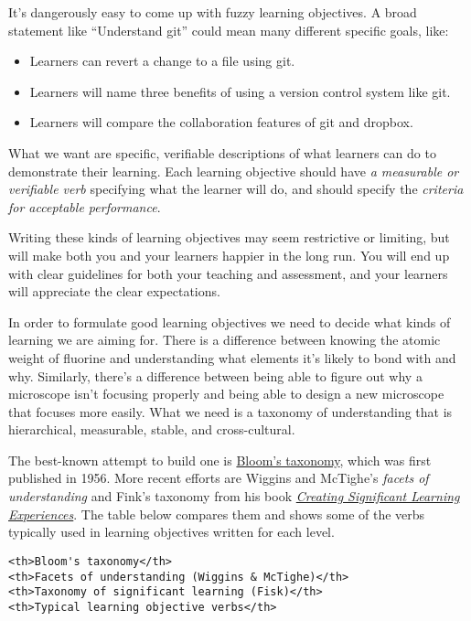 It's dangerously easy to come up with fuzzy learning objectives. A broad
statement like ``Understand git'' could mean many different specific
goals, like:

\begin{itemize}
\itemsep1pt\parskip0pt
\item
  Learners can revert a change to a file using git.
\item
  Learners will name three benefits of using a version control system
  like git.
\item
  Learners will compare the collaboration features of git and dropbox.
\end{itemize}

What we want are specific, verifiable descriptions of what learners can
do to demonstrate their learning. Each learning objective should have
\emph{a measurable or verifiable verb} specifying what the learner will
do, and should specify the \emph{criteria for acceptable performance}.

Writing these kinds of learning objectives may seem restrictive or
limiting, but will make both you and your learners happier in the long
run. You will end up with clear guidelines for both your teaching and
assessment, and your learners will appreciate the clear expectations.

In order to formulate good learning objectives we need to decide what
kinds of learning we are aiming for. There is a difference between
knowing the atomic weight of fluorine and understanding what elements
it's likely to bond with and why. Similarly, there's a difference
between being able to figure out why a microscope isn't focusing
properly and being able to design a new microscope that focuses more
easily. What we need is a taxonomy of understanding that is
hierarchical, measurable, stable, and cross-cultural.

The best-known attempt to build one is
\href{https://en.wikipedia.org/wiki/Bloom's\_taxonomy}{Bloom's taxonomy},
which was first published in 1956. More recent efforts are Wiggins and
McTighe's \emph{facets of understanding} and Fink's taxonomy from his
book
\emph{\href{http://www.amazon.com/Creating-Significant-Learning-Experiences-Integrated/dp/1118124251/}{Creating
Significant Learning Experiences}}. The table below compares them and
shows some of the verbs typically used in learning objectives written
for each level.

\begin{verbatim}
<th>Bloom's taxonomy</th>
<th>Facets of understanding (Wiggins & McTighe)</th>
<th>Taxonomy of significant learning (Fisk)</th>
<th>Typical learning objective verbs</th>
\end{verbatim}

